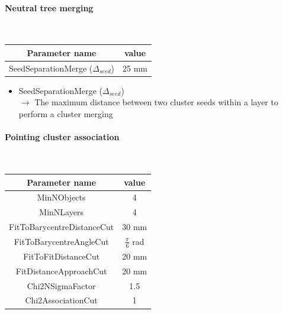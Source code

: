 \documentclass[cits]{JINST}
\begin{document}
\paragraph{Neutral tree merging} ~

\begin{table}[!ht]
  \begin{center}
    \begin{tabu} to \linewidth { c | c } 
          Parameter name & value \\
          \hline
          SeedSeparationMerge ($\Delta_{seed}$) & 25 mm
    \end{tabu}
  \end{center}
\end{table}

\begin{itemize}
  \item SeedSeparationMerge ($\Delta_{seed}$) \\
  $\rightarrow$ The maximum distance between two cluster seeds within a layer to perform a cluster merging
\end{itemize}


\paragraph{Pointing cluster association} ~

\begin{table}[!ht]
  \begin{center}
    \begin{tabu} to \linewidth { c | c } 
          Parameter name & value \\
          \hline
          MinNObjects & 4 \\
          MinNLayers & 4 \\
          FitToBarycentreDistanceCut & 30 mm \\
          FitToBarycentreAngleCut & $\frac{\pi}{6}$ rad \\
          FitToFitDistanceCut & 20 mm \\
          FitDistanceApproachCut & 20 mm \\
          Chi2NSigmaFactor & 1.5 \\
          Chi2AssociationCut & 1
    \end{tabu}
  \end{center}
\end{table}
\end{document}
